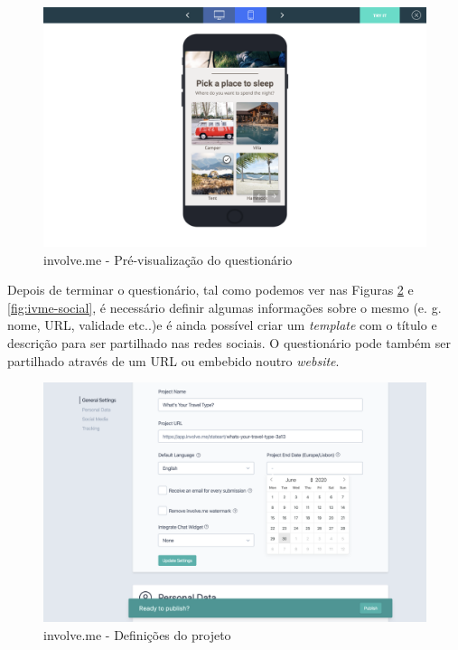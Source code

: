  \begin{figure}[ht!]
 	\begin{center}
 		\includegraphics[width=1\textwidth]{img/ivme/preview}
 		\caption{involve.me - Pré-visualização do questionário}
 		\label{fig:ivme-preview}
 	\end{center}
 \end{figure}
\newpage

Depois de terminar o questionário, tal como podemos ver nas Figuras \ref{fig:ivme-project} e \ref{fig:ivme-social}, é necessário definir algumas informações sobre o mesmo (e. g. nome, URL, validade etc..)e é ainda possível criar um \textit{template} com o título e descrição para ser partilhado nas redes sociais. O questionário pode também ser partilhado através de um URL ou embebido noutro \textit{website}.


\begin{figure}[ht!]
	\begin{center}
		\includegraphics[width=1\textwidth]{img/ivme/project}
		\caption{involve.me - Definições do projeto}
		\label{fig:ivme-project}
	\end{center}
\end{figure}

